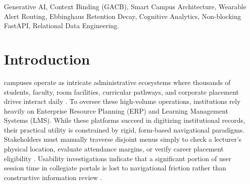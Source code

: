 \documentclass[conference]{IEEEtran}
\begin{document}
\begin{IEEEkeywords}
Generative AI, Context Binding (GACB), Smart Campus Architecture, Wearable Alert Routing, Ebbinghaus Retention Decay, Cognitive Analytics, Non-blocking FastAPI, Relational Data Engineering.
\end{IEEEkeywords}

\section{Introduction}
\label{sec:introduction}

 campuses operate as intricate administrative ecosystems where thousands of students, faculty, room facilities, curricular pathways, and corporate placement drives interact daily \cite{alshboul2020usability}. To oversee these high-volume operations, institutions rely heavily on Enterprise Resource Planning (ERP) and Learning Management Systems (LMS). While these platforms succeed in digitizing institutional records, their practical utility is constrained by rigid, form-based navigational paradigms. Stakeholders must manually traverse disjoint menus simply to check a lecturer's physical location, evaluate attendance margins, or verify career placement eligibility \cite{minallah2020smart, deoliveira2021semantic}. Usability investigations indicate that a significant portion of user session time in collegiate portals is lost to navigational friction rather than constructive information review \cite{alshboul2020usability}.
\end{document}

